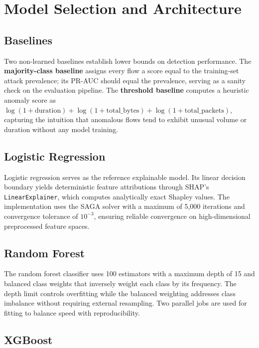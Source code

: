\documentclass[12pt,a4paper]{report}
\begin{document}
\section{Model Selection and Architecture}
\label{sec:models}

\subsection{Baselines}
\label{sec:baselines}

Two non-learned baselines establish lower bounds on detection performance. The \textbf{majority-class baseline} assigns every flow a score equal to the training-set attack prevalence; its PR-AUC should equal the prevalence, serving as a sanity check on the evaluation pipeline. The \textbf{threshold baseline} computes a heuristic anomaly score as $\log(1 + \text{duration}) + \log(1 + \text{total\_bytes}) + \log(1 + \text{total\_packets})$, capturing the intuition that anomalous flows tend to exhibit unusual volume or duration without any model training.

\subsection{Logistic Regression}
\label{sec:logreg}

Logistic regression serves as the reference explainable model. Its linear decision boundary yields deterministic feature attributions through SHAP's \texttt{LinearExplainer}, which computes analytically exact Shapley values. The implementation uses the SAGA solver with a maximum of 5,000 iterations and convergence tolerance of $10^{-3}$, ensuring reliable convergence on high-dimensional preprocessed feature spaces.

\subsection{Random Forest}
\label{sec:rf}

The random forest classifier uses 100 estimators with a maximum depth of 15 and balanced class weights that inversely weight each class by its frequency. The depth limit controls overfitting while the balanced weighting addresses class imbalance without requiring external resampling. Two parallel jobs are used for fitting to balance speed with reproducibility.

\subsection{XGBoost}
\label{sec:xgboost}
\end{document}
